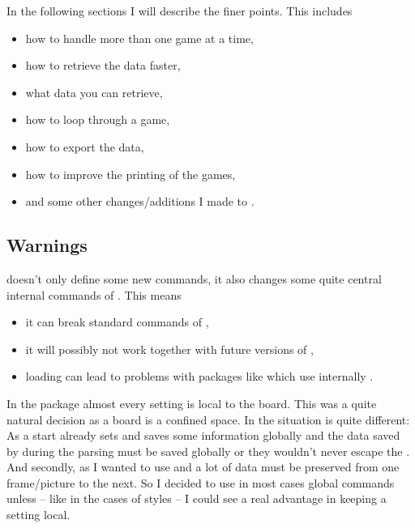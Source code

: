 \documentclass[pagesize,parskip=half-,fontsize=12pt]{scrartcl}
\begin{document}
\bigskip

In the following sections I will describe the finer points. This
includes
\begin{itemize}
\item how to handle more than one game at a time,
\item how to retrieve the data faster,
\item what data you can retrieve,
\item how to loop through a game,
\item how to export the data,
\item how to improve the printing of the games,
\item and some other changes/additions I made to .
\end{itemize}


\subsection{Warnings}


\Xskak doesn't only define some new commands, it also changes some
quite central internal commands of \skaksty. This means
\begin{itemize}
    \item it can break standard commands of \skaksty,

    \item it will possibly not work together with future versions of
    \skaksty,

    \item loading  can lead to problems with
    packages like  which use internally
    .
\end{itemize}


In the package  almost every setting is local
to the board. This was a quite natural decision as a board is a
confined space. In  the situation is quite
different: As a start  already sets and saves some
information globally and the data saved by 
during the parsing must be saved globally or they wouldn't never
escape the . And secondly, as I wanted to use
 and  a lot of data
must be preserved from one frame/picture to the next. So I decided to
use in most cases global commands unless -- like in the cases of
styles -- I could see a real advantage in keeping a setting local.
\end{document}
